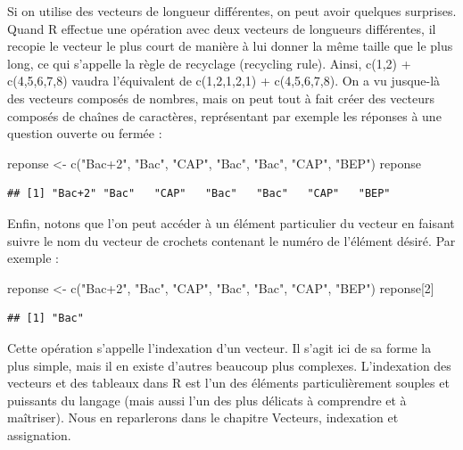 \documentclass[
]{book}
\newenvironment{Shaded}{\begin{snugshade}}{\end{snugshade}}
\newcommand{\DecValTok}[1]{\textcolor[rgb]{0.00,0.00,0.81}{#1}}
\newcommand{\FunctionTok}[1]{\textcolor[rgb]{0.00,0.00,0.00}{#1}}
\newcommand{\NormalTok}[1]{#1}
\newcommand{\OtherTok}[1]{\textcolor[rgb]{0.56,0.35,0.01}{#1}}
\newcommand{\StringTok}[1]{\textcolor[rgb]{0.31,0.60,0.02}{#1}}
\begin{document}
Si on utilise des vecteurs de longueur différentes, on peut avoir quelques surprises. Quand R effectue une opération avec deux vecteurs de longueurs différentes, il recopie le vecteur le plus court de manière à lui donner la même taille que le plus long, ce qui s'appelle la règle de recyclage (recycling rule). Ainsi, c(1,2) + c(4,5,6,7,8) vaudra l'équivalent de c(1,2,1,2,1) + c(4,5,6,7,8).
On a vu jusque-là des vecteurs composés de nombres, mais on peut tout à fait créer des vecteurs composés de chaînes de caractères, représentant par exemple les réponses à une question ouverte ou fermée :

\begin{Shaded}
\begin{Highlighting}[]
\NormalTok{reponse }\OtherTok{\textless{}{-}} \FunctionTok{c}\NormalTok{(}\StringTok{"Bac+2"}\NormalTok{, }\StringTok{"Bac"}\NormalTok{, }\StringTok{"CAP"}\NormalTok{, }\StringTok{"Bac"}\NormalTok{, }\StringTok{"Bac"}\NormalTok{, }\StringTok{"CAP"}\NormalTok{, }\StringTok{"BEP"}\NormalTok{)}
\NormalTok{reponse}
\end{Highlighting}
\end{Shaded}

\begin{verbatim}
## [1] "Bac+2" "Bac"   "CAP"   "Bac"   "Bac"   "CAP"   "BEP"
\end{verbatim}

Enfin, notons que l'on peut accéder à un élément particulier du vecteur en faisant suivre le nom du vecteur de crochets contenant le numéro de l'élément désiré. Par exemple :

\begin{Shaded}
\begin{Highlighting}[]
\NormalTok{reponse }\OtherTok{\textless{}{-}} \FunctionTok{c}\NormalTok{(}\StringTok{"Bac+2"}\NormalTok{, }\StringTok{"Bac"}\NormalTok{, }\StringTok{"CAP"}\NormalTok{, }\StringTok{"Bac"}\NormalTok{, }\StringTok{"Bac"}\NormalTok{, }\StringTok{"CAP"}\NormalTok{, }\StringTok{"BEP"}\NormalTok{)}
\NormalTok{reponse[}\DecValTok{2}\NormalTok{]}
\end{Highlighting}
\end{Shaded}

\begin{verbatim}
## [1] "Bac"
\end{verbatim}

Cette opération s'appelle l'indexation d'un vecteur. Il s'agit ici de sa forme la plus simple, mais il en existe d'autres beaucoup plus complexes. L'indexation des vecteurs et des tableaux dans R est l'un des éléments particulièrement souples et puissants du langage (mais aussi l'un des plus délicats à comprendre et à maîtriser). Nous en reparlerons dans le chapitre Vecteurs, indexation et assignation.
\end{document}
